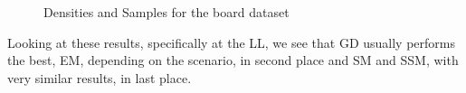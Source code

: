 \begin{figure}[H]
    \centering
    \vskip 5pt
    \vskip 5pt
    \caption{Densities and Samples for the board dataset}
    \label{fig:exp_moons}
\end{figure}
\newpage

Looking at these results, specifically at the LL, we see that GD 
usually performs the best, EM, depending on the scenario, in second place
and SM and SSM, with very similar results, in last place.

